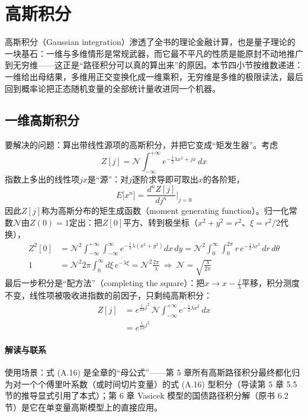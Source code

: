 \section{高斯积分}

高斯积分（Gaussian integration）渗透了全书的理论金融计算，也是量子理论的一块基石：一维与多维情形是常规武器，而它最不平凡的性质是能原封不动地推广到无穷维——这正是“路径积分可以真的算出来”的原因。本节四小节按维数递进：一维给出母结果，多维用正交变换化成一维乘积，无穷维是多维的极限读法，最后回到概率论把正态随机变量的全部统计量收进同一个机器。

\subsection{一维高斯积分}

要解决的问题：算出带线性源项的高斯积分，并把它变成“矩发生器”。考虑
\begin{equation*}
Z[j]=\mathcal{N}\int_{-\infty}^{+\infty}
e^{-\frac{1}{2}\lambda x^2+jx}\,dx
\end{equation*}
指数上多出的线性项$jx$是“源”：对$j$逐阶求导即可取出$x$的各阶矩，
\begin{equation*}
E\bigl[x^n\bigr]=\frac{d^n Z[j]}{dj^n}\Bigr|_{j=0}
\end{equation*}
因此$Z[j]$称为高斯分布的矩生成函数（moment generating function）。归一化常数$\mathcal{N}$由$Z(0)=1$定出：把$Z[0]$平方、转到极坐标（$x^2+y^2=r^2$、$\xi=r^2/2$代换），
\begin{align*}
Z^2[0]&=\mathcal{N}^2\int_{-\infty}^{+\infty}\int_{-\infty}^{\infty}
e^{-\frac{1}{2}\lambda(x^2+y^2)}dx\,dy
=\mathcal{N}^2\int_0^{\infty}\int_0^{2\pi}
r\,e^{-\frac{1}{2}\lambda r^2}\,dr\,d\theta\\
1&=\mathcal{N}^2 2\pi\int_0^{\infty}d\xi\,e^{-\lambda\xi}
=\mathcal{N}^2\frac{2\pi}{\lambda}
\ \Rightarrow\ \mathcal{N}=\sqrt{\frac{\lambda}{2\pi}}
\end{align*}
最后一步积分是“配方法”（completing the square）：把$x\to x-\frac{j}{\lambda}$平移，积分测度不变，线性项被吸收进指数的前因子，只剩纯高斯积分：
\begin{align*}
Z[j]&=e^{\frac{1}{2\lambda}j^2}\,
\mathcal{N}\int_{-\infty}^{+\infty}e^{-\frac{1}{2}\lambda x^2}\,dx\\
&=e^{\frac{1}{2\lambda}j^2}
\tag{A.16}
\end{align*}

\paragraph{解读与联系}
使用场景：式 (A.16) 是全章的“母公式”——第 5 章所有高斯路径积分最终都化归为对一个个傅里叶系数（或时间切片变量）的式 (A.16) 型积分（导读第 5 章 5.5 节的推导显式引用了本式）；第 6 章 Vasicek 模型的国债路径积分解（原书 6.2 节）是它在单变量高斯模型上的直接应用。

